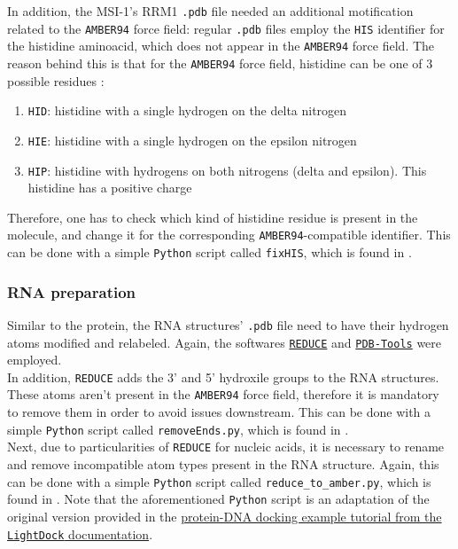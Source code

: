 In addition, the MSI-1's RRM1 \texttt{.pdb} file needed an additional motification related to the \texttt{AMBER94} force field: regular \texttt{.pdb} files employ the \texttt{HIS} identifier for the histidine aminoacid, which does not appear in the \texttt{AMBER94} force field. The reason behind this is that for the \texttt{AMBER94} force field, histidine can be one of 3 possible residues \cite{amber_histidine}:

\begin{enumerate}
    \item\texttt{HID}: histidine with a single hydrogen on the delta nitrogen
    \item\texttt{HIE}: histidine with a single hydrogen on the epsilon nitrogen
    \item\texttt{HIP}: histidine with hydrogens on both nitrogens (delta and epsilon). This histidine has a positive charge
\end{enumerate}

Therefore, one has to check which kind of histidine residue is present in the molecule, and change it for the corresponding \texttt{AMBER94}-compatible identifier. This can be done with a simple \texttt{Python} script called \texttt{fixHIS}, which is found in \textbf{}.

\subsubsection{RNA preparation}

Similar to the protein, the RNA structures' \texttt{.pdb} file need to have their hydrogen atoms modified and relabeled. Again, the softwares \href{https://github.com/rlabduke/reduce}{\texttt{REDUCE}} and \href{https://github.com/haddocking/pdb-tools/}{\texttt{PDB-Tools}} \cite{rodrigues_2018} were employed.\\

In addition, \texttt{REDUCE} adds the 3' and 5' hydroxile groups to the RNA structures. These atoms aren't present in the \texttt{AMBER94} force field, therefore it is mandatory to remove them in order to avoid issues downstream. This can be done with a simple \texttt{Python} script called \texttt{removeEnds.py}, which is found in \textbf{}.\\

Next, due to particularities of \texttt{REDUCE} for nucleic acids, it is necessary to rename and remove incompatible atom types present in the RNA structure. Again, this can be done with a simple \texttt{Python} script called \texttt{reduce\_to\_amber.py}, which is found in \textbf{}. Note that the aforementioned \texttt{Python} script is an adaptation of the original version provided in the \href{https://lightdock.org/tutorials/0.9.3/dna_docking}{protein-DNA docking example tutorial from the \texttt{LightDock} documentation}.\\

